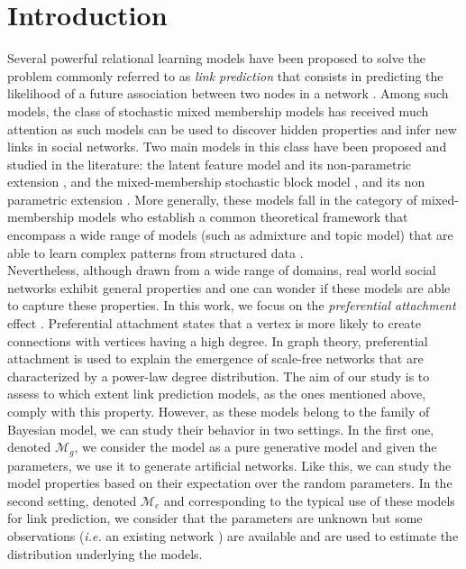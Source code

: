
\section{Introduction}
\label{sec:intro}

Several powerful relational learning models have been proposed to solve the problem commonly referred to as \textit{link prediction} that consists in predicting the likelihood of a future association between two nodes in a network \cite{LibenNowell07,HassanZaki11}. Among such models, the class of stochastic mixed membership models has received much attention as such models can be used to discover hidden properties and infer new links in social networks. Two main models in this class have been proposed and studied in the literature: the latent feature model \cite{BMF} and its non-parametric extension \cite{ILFRM}, and the mixed-membership stochastic block model \cite{MMSB}, and its non parametric extension \cite{iMMSB,fan2015dynamic}. More generally, these models fall in the category of mixed-membership models who establish a common theoretical framework that encompass a wide range of models (such as admixture and topic model) that are able to  learn complex patterns from structured data \cite{airoldi2014handbook}.~\\
Nevertheless, although drawn from a wide range of domains, real world social networks exhibit general properties and one can wonder if these models are able to capture these properties. In this work, we focus on the \textit{preferential attachment} effect \cite{Newman2010, Barabasi2003}. Preferential attachment states that a vertex is more likely to create connections with vertices having a high degree. In graph theory, preferential attachment is used to explain the emergence of scale-free networks that are characterized by a power-law degree distribution. The aim of our study is to assess to which extent link prediction models, as the ones mentioned above, comply with this property. However, as these models belong to the family of Bayesian model,  we can study their behavior in two settings.  In the first one, denoted $\mathcal{M}_g$, we consider the model as a pure generative model and given the parameters, we use it to generate artificial networks. Like this, we can study the model properties based on their expectation over the random parameters. In the second setting, denoted $\mathcal{M}_e$ and corresponding to the typical use of these models for link prediction, we consider that the parameters are unknown but some observations (\textit{i.e.} an existing network ) are available and are used to estimate the distribution underlying the models. 


